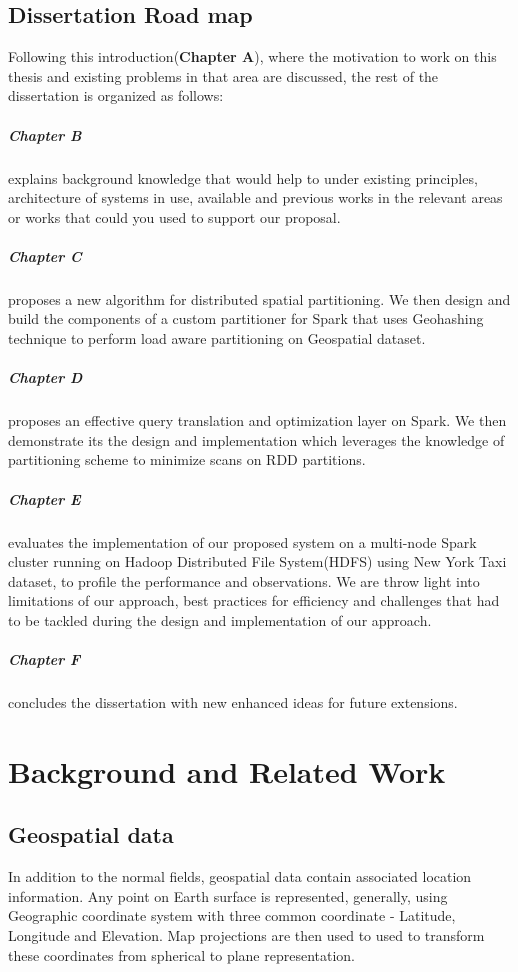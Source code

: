\documentclass[article,type=msc,colorback,12pt,accentcolor=tud1d]{tudthesis}
\begin{document}
		\hfill
		\subsection{Dissertation Road map}
		
		Following this introduction(\textbf{Chapter A}), where the motivation to work on this thesis and existing problems in that area are discussed, the rest of the dissertation is organized as follows: 
		
		\subparagraph{Chapter B} explains background knowledge that would help to under existing principles, architecture of systems in use, available and previous works in the relevant areas or works that could you used to support our proposal.  
		
		\subparagraph{Chapter C} proposes a new algorithm for distributed spatial partitioning. We then design and build the components of a custom partitioner for Spark that uses Geohashing technique to perform load aware partitioning on Geospatial dataset. 
		
		\subparagraph{Chapter D} proposes an effective query translation and optimization layer on Spark. We then demonstrate its the design and implementation which leverages the knowledge of partitioning scheme to minimize scans on RDD partitions. 
		
		\subparagraph{Chapter E} evaluates the implementation of our proposed system on a multi-node Spark cluster running on Hadoop Distributed File System(HDFS) using New York Taxi dataset, to profile the performance and observations. We are throw light into limitations of our approach, best practices for efficiency and challenges that had to be tackled during the design and implementation of our approach. 
		
		\subparagraph{Chapter F} concludes the dissertation with new enhanced ideas for future extensions. 

	\clearpage

	\hfill
  \section{Background and Related Work}
  \hfill
	  
		   \subsection{Geospatial data }
			   \par In addition to the normal fields, geospatial data contain associated location information. Any point on Earth surface is represented, generally, using Geographic coordinate system with three common coordinate - Latitude, Longitude and Elevation. Map projections are then used to used to transform these coordinates from spherical to plane representation. 
			   
\end{document}
